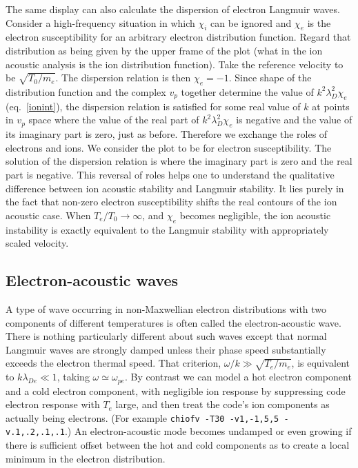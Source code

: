 \documentclass[12pt]{article}
\begin{document}
The same display can also calculate the dispersion of electron
Langmuir waves. Consider a high-frequency situation in which $\chi_i$
can be ignored and $\chi_e$ is the electron susceptibility for an
arbitrary electron distribution function. Regard that distribution as
being given by the upper frame of the plot (what in the ion acoustic
analysis is the ion distribution function). Take the reference
velocity to be $\sqrt{T_0/m_e}$. The dispersion relation is then
$\chi_e=-1$. Since shape of the distribution function and the complex
$v_p$ together determine the value of $k^2\lambda_D^2 \chi_e$ (eq.\
\ref{ionint}), the dispersion relation is satisfied for some real
value of $k$ at points in $v_p$ space where the value of the real part
of $k^2\lambda_D^2 \chi_e$ is negative and the value of its imaginary
part is zero, just as before.  Therefore we exchange the roles of
electrons and ions. We consider the plot to be for electron
susceptibility. The solution of the dispersion relation is where the
imaginary part is zero and the real part is negative. This reversal of
roles helps one to understand the qualitative difference between ion
acoustic stability and Langmuir stability. It lies purely in the fact
that non-zero electron susceptibility shifts the real contours of the
ion acoustic case. When $T_e/T_0\to\infty$, and $\chi_e$ becomes
negligible, the ion acoustic instability is exactly equivalent to the
Langmuir stability with appropriately scaled velocity.


\subsection{Electron-acoustic waves}

A type of wave occurring in non-Maxwellian electron distributions with
two components of different temperatures is often called the
electron-acoustic wave. There is nothing particularly different about
such waves except that normal Langmuir waves are strongly damped
unless their phase speed substantially exceeds the electron thermal
speed. That criterion, $\omega/k\gg \sqrt{T_e/m_e}$, is equivalent to
$k\lambda_{De}\ll 1$, taking $\omega\simeq \omega_{pe}$. By contrast
we can model a hot electron component and a cold electron component,
with negligible ion response by
suppressing code electron response with $T_e$ large, and then treat
the code's ion components as actually being electrons. (For example
\verb!chiofv -T30 -v1,-1,5,5 -v.1,.2,.1,.1!.) An electron-acoustic
mode becomes undamped or even growing if there is sufficient offset
between the hot and cold components as to create a local minimum in
the electron distribution.
\end{document}
